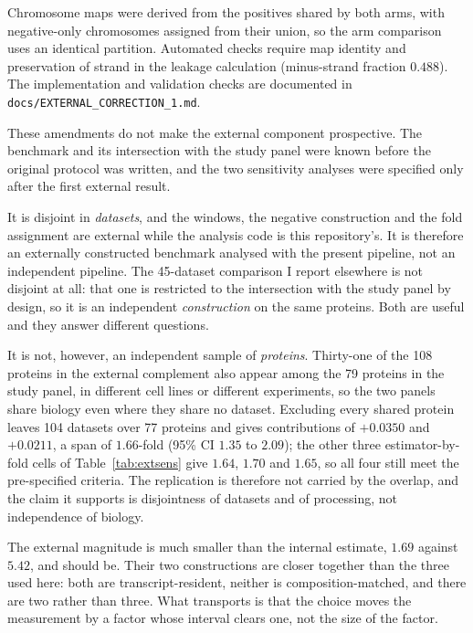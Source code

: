 Chromosome maps were derived from the positives shared by both arms, with negative-only
chromosomes assigned from their union, so the arm comparison uses an identical partition.
Automated checks require map identity and preservation of strand in the leakage calculation
(minus-strand fraction $0.488$). The implementation and validation checks are documented in
\texttt{docs/\allowbreak EXTERNAL\_\allowbreak CORRECTION\_1.md}.

These amendments do not make the external component prospective. The benchmark and its
intersection with the study panel were known before the original protocol was written, and the two
sensitivity analyses were specified only after the first external result.

It is disjoint in \emph{datasets}, and the windows, the negative construction and the fold
assignment are external while the analysis code is this repository's. It is therefore an
externally constructed benchmark analysed with the present pipeline, not an independent pipeline. The
45-dataset comparison I report elsewhere is not disjoint at all: that one is restricted to the intersection
with the study panel by design, so it is an independent \emph{construction} on the same proteins.
Both are useful and they answer different questions.

It is not, however, an independent sample of \emph{proteins}. Thirty-one of the 108 proteins in
the external complement also appear among the 79 proteins in the study panel, in different cell lines or different
experiments, so the two panels share biology even where they share no dataset. Excluding every
shared protein leaves 104 datasets over 77 proteins and gives contributions of $+0.0350$ and
$+0.0211$, a span of $1.66$-fold (95\% CI $1.35$ to $2.09$); the other three estimator-by-fold
cells of Table~\ref{tab:extsens} give $1.64$, $1.70$ and $1.65$, so all four still meet the
pre-specified criteria. The replication is therefore not carried by the overlap, and the claim
it supports is disjointness of datasets and of processing, not independence of biology.

The external magnitude is much smaller than the internal estimate, $1.69$ against $5.42$, and should be. Their two
constructions are closer together than the three used here: both are transcript-resident, neither is
composition-matched, and there are two rather than three. What transports is that the choice
moves the measurement by a factor whose interval clears one, not the size of the factor.

